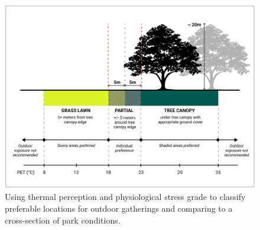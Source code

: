 \begin{figure}[h]
  \centering
  \captionsetup{width=1.0\linewidth}
  \includegraphics[width=1.0\textwidth]{images/gatherings/shade_sun_trees.png}
  \caption[Shade and Sun Tree Section]{Using thermal perception and physiological stress grade to classify preferable locations for outdoor gatherings and comparing to a cross-section of park conditions.} 
  \label{fig:shade_and_sun}
\end{figure}

